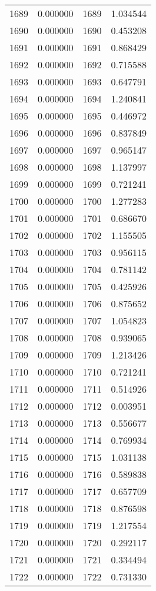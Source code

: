 \documentclass[12pt]{article}
\begin{document}
\begin{longtable}{@{}cccc@{}}
1689 & 0.000000 & 1689 & 1.034544 \\
1690 & 0.000000 & 1690 & 0.453208 \\
1691 & 0.000000 & 1691 & 0.868429 \\
1692 & 0.000000 & 1692 & 0.715588 \\
1693 & 0.000000 & 1693 & 0.647791 \\
1694 & 0.000000 & 1694 & 1.240841 \\
1695 & 0.000000 & 1695 & 0.446972 \\
1696 & 0.000000 & 1696 & 0.837849 \\
1697 & 0.000000 & 1697 & 0.965147 \\
1698 & 0.000000 & 1698 & 1.137997 \\
1699 & 0.000000 & 1699 & 0.721241 \\
1700 & 0.000000 & 1700 & 1.277283 \\
1701 & 0.000000 & 1701 & 0.686670 \\
1702 & 0.000000 & 1702 & 1.155505 \\
1703 & 0.000000 & 1703 & 0.956115 \\
1704 & 0.000000 & 1704 & 0.781142 \\
1705 & 0.000000 & 1705 & 0.425926 \\
1706 & 0.000000 & 1706 & 0.875652 \\
1707 & 0.000000 & 1707 & 1.054823 \\
1708 & 0.000000 & 1708 & 0.939065 \\
1709 & 0.000000 & 1709 & 1.213426 \\
1710 & 0.000000 & 1710 & 0.721241 \\
1711 & 0.000000 & 1711 & 0.514926 \\
1712 & 0.000000 & 1712 & 0.003951 \\
1713 & 0.000000 & 1713 & 0.556677 \\
1714 & 0.000000 & 1714 & 0.769934 \\
1715 & 0.000000 & 1715 & 1.031138 \\
1716 & 0.000000 & 1716 & 0.589838 \\
1717 & 0.000000 & 1717 & 0.657709 \\
1718 & 0.000000 & 1718 & 0.876598 \\
1719 & 0.000000 & 1719 & 1.217554 \\
1720 & 0.000000 & 1720 & 0.292117 \\
1721 & 0.000000 & 1721 & 0.334494 \\
1722 & 0.000000 & 1722 & 0.731330 \\

\end{longtable}
\end{document}
